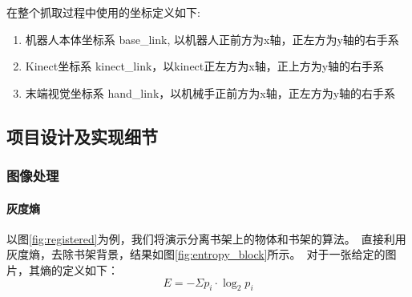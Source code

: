 在整个抓取过程中使用的坐标定义如下:
\begin{enumerate}
    \item 机器人本体坐标系 base\_link, 以机器人正前方为x轴，正左方为y轴的右手系
    \item Kinect坐标系 kinect\_link，以kinect正左方为x轴，正上方为y轴的右手系
    \item 末端视觉坐标系 hand\_link，以机械手正前方为x轴，正左方为y轴的右手系
\end{enumerate}

\subsection{项目设计及实现细节}
\subsubsection{图像处理}
\paragraph{灰度熵}

以图\ref{fig:registered}为例，我们将演示分离书架上的物体和书架的算法。\ 直接利用灰度熵，去除书架背景，结果如图\ref{fig:entropy_block}所示。\ 对于一张给定的图片，其熵的定义如下：
\begin{equation}
	E = -\Sigma p_{i} \cdot \log_{2}p_{i}
\end{equation}

